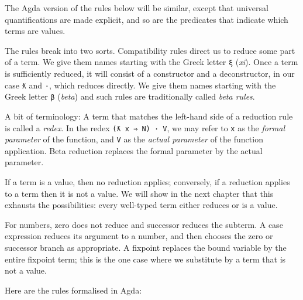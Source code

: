 The Agda version of the rules below will be similar, except that
universal quantifications are made explicit, and so are the predicates
that indicate which terms are values.

The rules break into two sorts. Compatibility rules direct us to reduce
some part of a term. We give them names starting with the Greek letter
\texttt{ξ} (\emph{xi}). Once a term is sufficiently reduced, it will
consist of a constructor and a deconstructor, in our case \texttt{ƛ} and
\texttt{·}, which reduces directly. We give them names starting with the
Greek letter \texttt{β} (\emph{beta}) and such rules are traditionally
called \emph{beta rules}.

A bit of terminology: A term that matches the left-hand side of a
reduction rule is called a \emph{redex}. In the redex
\texttt{(ƛ\ x\ ⇒\ N)\ ·\ V}, we may refer to \texttt{x} as the
\emph{formal parameter} of the function, and \texttt{V} as the
\emph{actual parameter} of the function application. Beta reduction
replaces the formal parameter by the actual parameter.

If a term is a value, then no reduction applies; conversely, if a
reduction applies to a term then it is not a value. We will show in the
next chapter that this exhausts the possibilities: every well-typed term
either reduces or is a value.

For numbers, zero does not reduce and successor reduces the subterm. A
case expression reduces its argument to a number, and then chooses the
zero or successor branch as appropriate. A fixpoint replaces the bound
variable by the entire fixpoint term; this is the one case where we
substitute by a term that is not a value.

Here are the rules formalised in Agda:

